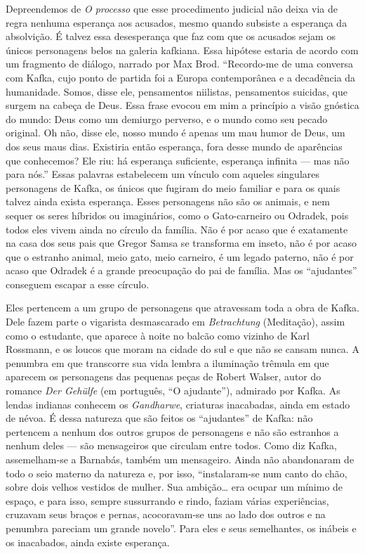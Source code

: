 Depreendemos de \textit{O processo} que esse procedimento judicial não deixa
via de regra nenhuma esperança aos acusados, mesmo quando subsiste a
esperança da absolvição. É talvez essa desesperança que faz com que os
acusados sejam os únicos personagens belos na galeria kafkiana. Essa
hipótese estaria de acordo com um fragmento de diálogo, narrado por Max
Brod. ``Recordo-me de uma conversa com Kafka, cujo ponto de partida foi
a Europa contemporânea e a decadência da humanidade. Somos, disse ele,
pensamentos niilistas, pensamentos suicidas, que surgem na cabeça de
Deus. Essa frase evocou em mim a princípio a visão gnóstica do mundo:
Deus como um demiurgo perverso, e o mundo como seu pecado original. Oh
não, disse ele, nosso mundo é apenas um mau humor de Deus, um dos seus
maus dias. Existiria então esperança, fora desse mundo de aparências que
conhecemos? Ele riu: há esperança suficiente, esperança infinita --- mas
não para nós.'' Essas palavras estabelecem um vínculo com aqueles
singulares personagens de Kafka, os únicos que fugiram do meio familiar
e para os quais talvez ainda exista esperança. Esses personagens não são
os animais, e nem sequer os seres híbridos ou imaginários, como o
Gato-carneiro ou Odradek, pois todos eles vivem ainda no círculo da
família. Não é por acaso que é exatamente na casa dos seus pais que
Gregor Samsa se transforma em inseto, não é por acaso que o estranho
animal, meio gato, meio carneiro, é um legado paterno, não é por acaso
que Odradek é a grande preocupação do pai de família. Mas os
``ajudantes'' conseguem escapar a esse círculo.

Eles pertencem a um grupo de personagens que atravessam toda a obra de
Kafka. Dele fazem parte o vigarista desmascarado em \textit{Betrachtung}
(Meditação), assim como o estudante, que aparece à noite no balcão
como vizinho de Karl Rossmann, e os loucos que moram na cidade do sul e
que não se cansam nunca. A penumbra em que transcorre sua vida lembra a
iluminação trêmula em que aparecem os personagens das pequenas peças de
Robert Walser, autor do romance \textit{Der Gehülfe} (em português, ``O ajudante''), admirado
por Kafka. As lendas indianas conhecem os \textit{Gandharwe}, criaturas
inacabadas, ainda em estado de névoa. É dessa natureza que são feitos os
``ajudantes'' de Kafka: não pertencem a nenhum dos outros grupos de
personagens e não são estranhos a nenhum deles --- são mensageiros que
circulam entre todos. Como diz Kafka, assemelham-se a Barnabás, também
um mensageiro. Ainda não abandonaram de todo o seio materno da natureza
e, por isso, ``instalaram-se num canto do chão, sobre dois velhos
vestidos de mulher. Sua ambição\ldots{} era ocupar um mínimo de espaço, e
para isso, sempre sussurrando e rindo, faziam várias experiências,
cruzavam seus braços e pernas, acocoravam-se uns ao lado dos outros e na
penumbra pareciam um grande novelo''. Para eles e seus semelhantes, os
inábeis e os inacabados, ainda existe esperança.

